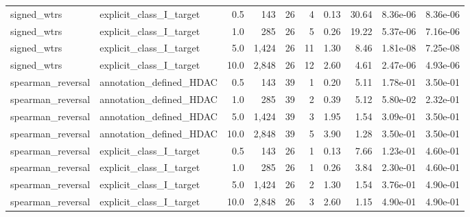 \begin{landscape}
\begin{longtable}{@{}llrrrrrrrr@{}}
signed\_wtrs & explicit\_class\_I\_target & 0.5 & 143 & 26 & 4 & 0.13 & 30.64 & 8.36e-06 & 8.36e-06 \\
signed\_wtrs & explicit\_class\_I\_target & 1.0 & 285 & 26 & 5 & 0.26 & 19.22 & 5.37e-06 & 7.16e-06 \\
signed\_wtrs & explicit\_class\_I\_target & 5.0 & 1,424 & 26 & 11 & 1.30 & 8.46 & 1.81e-08 & 7.25e-08 \\
signed\_wtrs & explicit\_class\_I\_target & 10.0 & 2,848 & 26 & 12 & 2.60 & 4.61 & 2.47e-06 & 4.93e-06 \\
spearman\_reversal & annotation\_defined\_HDAC & 0.5 & 143 & 39 & 1 & 0.20 & 5.11 & 1.78e-01 & 3.50e-01 \\
spearman\_reversal & annotation\_defined\_HDAC & 1.0 & 285 & 39 & 2 & 0.39 & 5.12 & 5.80e-02 & 2.32e-01 \\
spearman\_reversal & annotation\_defined\_HDAC & 5.0 & 1,424 & 39 & 3 & 1.95 & 1.54 & 3.09e-01 & 3.50e-01 \\
spearman\_reversal & annotation\_defined\_HDAC & 10.0 & 2,848 & 39 & 5 & 3.90 & 1.28 & 3.50e-01 & 3.50e-01 \\
spearman\_reversal & explicit\_class\_I\_target & 0.5 & 143 & 26 & 1 & 0.13 & 7.66 & 1.23e-01 & 4.60e-01 \\
spearman\_reversal & explicit\_class\_I\_target & 1.0 & 285 & 26 & 1 & 0.26 & 3.84 & 2.30e-01 & 4.60e-01 \\
spearman\_reversal & explicit\_class\_I\_target & 5.0 & 1,424 & 26 & 2 & 1.30 & 1.54 & 3.76e-01 & 4.90e-01 \\
spearman\_reversal & explicit\_class\_I\_target & 10.0 & 2,848 & 26 & 3 & 2.60 & 1.15 & 4.90e-01 & 4.90e-01 \\
\end{longtable}
\endgroup
\end{landscape}
